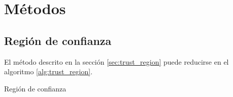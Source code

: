 \pagebreak
\section{Métodos}

\subsection{Región de confianza}

El método descrito en la sección \ref{sec:trust_region} puede reducirse en el algoritmo \ref{alg:trust_region}.

\begin{algorithm}
    \caption{Región de confianza}
    \label{alg:trust_region}
\end{algorithm}
